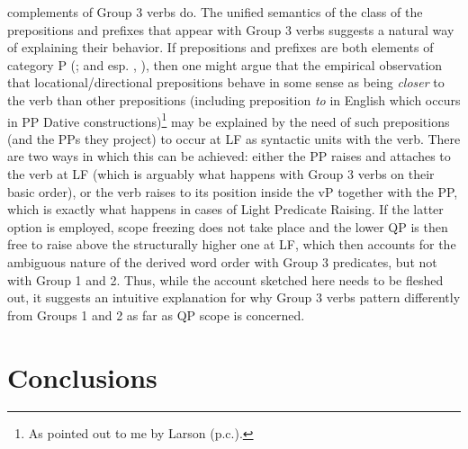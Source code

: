 \documentclass[output=paper,colorlinks,citecolor=brown]{./langscibook}
\begin{document}
complements of Group 3 verbs do. The unified semantics of the class of the prepositions and prefixes that appear with Group 3 verbs suggests a natural way of explaining their behavior. If prepositions and prefixes are both elements of category P (\citealt{Matushansky2002, Biskup2017}; and esp. \citealt{Svenonius2004Slavic}, \citeyear{Svenonius2008}), then one might argue that the empirical observation that locational/directional prepositions behave in some sense as being \textit{closer} to the verb than other prepositions (including preposition \textit{to} in English which occurs in PP Dative constructions)\footnote{As pointed out to me by Larson (p.c.).} may be explained by the need of such prepositions (and the PPs they project) to occur at LF as syntactic units with the verb. There are two ways in which this can be achieved: either the PP raises and attaches to the verb at LF (which is arguably what happens with Group 3 verbs on their basic order), or the verb raises to its position inside the vP together with the PP, which is exactly what happens in cases of Light Predicate Raising. If the latter option is employed, scope freezing does not take place and the lower QP is then free to raise above the structurally higher one at LF, which then accounts for the ambiguous nature of the derived word order with Group 3 predicates, but not with Group 1 and 2. Thus, while the account sketched here needs to be fleshed out, it suggests an intuitive explanation for why Group 3 verbs pattern differently from Groups 1 and 2 as far as QP scope is concerned.

\section{Conclusions}\label{sec:antonyuk:5}
\end{document}
